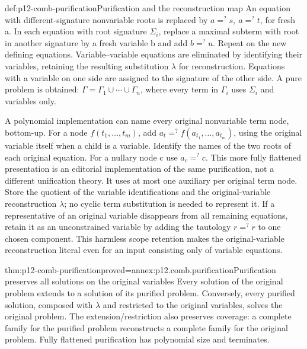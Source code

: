 \begin{hbmethod}{def:p12-comb-purification}{Purification and the reconstruction map}
An equation with different-signature nonvariable roots is replaced by
\(a=^{?}s,\ a=^{?}t\), for fresh a. In each equation with root signature
\(\Sigma_i\), replace a maximal subterm with root in another signature
by a fresh variable b and add \(b=^{?}u\). Repeat on the new defining
equations. Variable--variable equations are eliminated by identifying
their variables, retaining the resulting substitution \(\lambda\) for
reconstruction. Equations with a variable on one side are assigned to
the signature of the other side. A pure problem is obtained:
\(\Gamma=\Gamma_1\cup\cdots\cup\Gamma_n\), where every term in
\(\Gamma_i\) uses \(\Sigma_i\) and variables only.

A polynomial implementation can name every original nonvariable term
node, bottom-up. For a node \(f(t_1,\ldots,t_m)\), add
\(a_t=^{?}f(a_{t_1},\ldots,a_{t_m})\), using the original variable
itself when a child is a variable. Identify the names of the two roots
of each original equation. For a nullary node c use \(a_c=^{?}c\).
This more fully flattened presentation is an editorial implementation
of the same purification, not a different unification theory. It uses
at most one auxiliary per original term node. Store the quotient of
the variable identifications and the original-variable reconstruction
\(\lambda\); no cyclic term substitution is needed to represent it.
If a representative of an original variable disappears from all
remaining equations, retain it as an unconstrained variable by adding
the tautology \(r=^{?}r\) to one chosen component. This harmless
scope retention makes the original-variable reconstruction literal
even for an input consisting only of variable equations.
\end{hbmethod}

\begin{hblemma}{thm:p12-comb-purification}{proved=annex:p12.comb.purification}{Purification preserves all solutions on the original variables}
Every solution of the original problem extends to a solution of its
purified problem. Conversely, every purified solution, composed with
\(\lambda\) and restricted to the original variables, solves the
original problem. The extension/restriction also preserves coverage:
a complete family for the purified problem reconstructs a complete
family for the original problem. Fully flattened purification has
polynomial size and terminates.
\end{hblemma}

